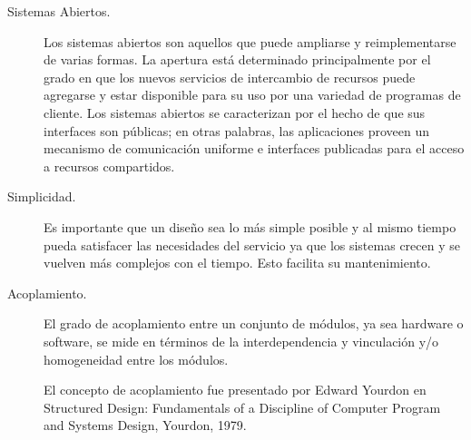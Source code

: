 \begin{description}
		\item[{Sistemas Abiertos.}]  Los \gls{sistemas abiertos}  son aquellos que  puede ampliarse y reimplementarse de varias formas. La apertura  está determinado principalmente por el grado en que los nuevos servicios de intercambio de recursos puede agregarse y estar disponible para su uso por una variedad de programas de cliente.
		Los sistemas abiertos se caracterizan por el hecho de que sus interfaces son públicas; en otras palabras, las aplicaciones proveen un mecanismo de comunicación uniforme e interfaces  publicadas para el acceso a recursos compartidos.
		
		\item [{Simplicidad.}]  Es importante que un diseño sea lo más simple posible y al mismo tiempo pueda satisfacer las necesidades del servicio ya que los sistemas crecen y se vuelven más complejos con el tiempo. Esto facilita su mantenimiento.
		
		\item[{Acoplamiento.}] 
		
		El grado de \gls{acoplamiento} entre un conjunto de módulos, ya sea hardware o software, se mide en términos de la interdependencia y vinculación y/o homogeneidad entre los módulos. 
		
	 
		
		\begin{tcolorbox}
			[colback=red!5!white,colframe=red!75!black,fonttitle=\bfseries,title=Acoplamiento]
				El concepto de acoplamiento fue presentado por Edward Yourdon en  Structured Design: Fundamentals of a Discipline of Computer Program and Systems Design, Yourdon, 1979.
		\end{tcolorbox}
		

\end{description}
